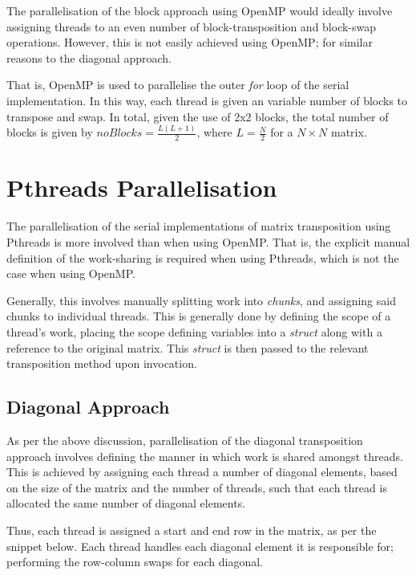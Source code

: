 \documentclass[journal,10pt]{IEEEtran}
\begin{document}
The parallelisation of the block approach using OpenMP would ideally involve assigning threads to an even number of block-transposition and block-swap operations. However, this is not easily achieved using OpenMP; for similar reasons to the diagonal approach.


That is, OpenMP is used to parallelise the outer \textit{for} loop of the serial implementation. In this way, each thread is given an variable number of blocks to transpose and swap. In total, given the use of 2x2 blocks, the total number of blocks is given by $noBlocks=\frac{L(L+1)}{2}$, where $L=\frac{N}{2}$ for a $N\times N$ matrix.



\section{Pthreads Parallelisation}
The parallelisation of the serial implementations of matrix transposition using Pthreads is more involved than when using OpenMP. That is, the explicit manual definition of the work-sharing is required when using Pthreads, which is not the case when using OpenMP.

Generally, this involves manually splitting work into \textit{chunks}, and assigning said chunks to individual threads. This is generally done by defining the scope of a thread's work, placing the scope defining variables into a \textit{struct} along with a reference to the original matrix. This \textit{struct} is then passed to the relevant transposition method upon invocation.%

\subsection{Diagonal Approach}

As per the above discussion, parallelisation of the diagonal transposition approach involves defining the manner in which work is shared amongst threads. This is achieved by assigning each thread a number of diagonal elements, based on the size of the matrix and the number of threads, such that each thread is allocated the same number of diagonal elements.



Thus, each thread is assigned a start and end row in the matrix, as per the snippet below. Each thread handles each diagonal element it is responsible for; performing the row-column swaps for each diagonal.
\end{document}
